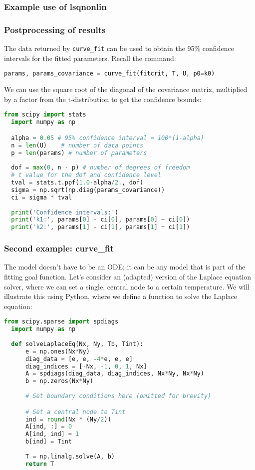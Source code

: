 \begin{frame}[fragile] 
  \frametitle{Example use of lsqnonlin}
  \centering
\end{frame}

\begin{frame}[fragile] 
  \frametitle{Postprocessing of results}
  The data returned by \lstinline|curve_fit| can be used to obtain the 95\% confidence intervals for the fitted parameters. Recall the command:
  \begin{lstlisting}[language=Python]
  params, params_covariance = curve_fit(fitcrit, T, U, p0=k0)
  \end{lstlisting}
  We can use the square root of the diagonal of the covariance matrix, multiplied by a factor from the t-distribution to get the confidence bounds:
  \begin{lstlisting}[language=Python]
  from scipy import stats
  import numpy as np

  alpha = 0.05 # 95% confidence interval = 100*(1-alpha)
  n = len(U)    # number of data points
  p = len(params) # number of parameters
  
  dof = max(0, n - p) # number of degrees of freedom
  # t value for the dof and confidence level
  tval = stats.t.ppf(1.0-alpha/2., dof) 
  sigma = np.sqrt(np.diag(params_covariance))
  ci = sigma * tval
  
  print('Confidence intervals:')
  print('k1:', params[0] - ci[0], params[0] + ci[0])
  print('k2:', params[1] - ci[1], params[1] + ci[1])
  \end{lstlisting}
  \end{frame}


  \begin{frame}[fragile]
    \frametitle{Second example: curve\_fit}
    The model doesn't have to be an ODE; it can be any model that is part of the fitting goal function. Let's consider an (adapted) version of the Laplace equation solver, where we can set a single, central node to a certain temperature. We will illustrate this using Python, where we define a function to solve the Laplace equation:
    
    \begin{lstlisting}[language=Python]
  from scipy.sparse import spdiags
  import numpy as np
  
  def solveLaplaceEq(Nx, Ny, Tb, Tint):
      e = np.ones(Nx*Ny)
      diag_data = [e, e, -4*e, e, e]
      diag_indices = [-Nx, -1, 0, 1, Nx]
      A = spdiags(diag_data, diag_indices, Nx*Ny, Nx*Ny)
      b = np.zeros(Nx*Ny)
      
      # Set boundary conditions here (omitted for brevity)

      # Set a central node to Tint
      ind = round(Nx * (Ny/2))
      A[ind, :] = 0
      A[ind, ind] = 1
      b[ind] = Tint
      
      T = np.linalg.solve(A, b)
      return T
    \end{lstlisting}
  \end{frame}
  

